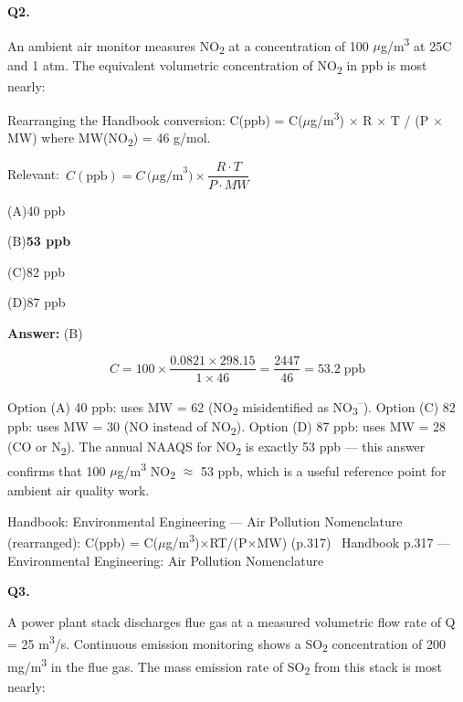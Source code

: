 \documentclass[11pt]{article}
\newcommand{\correct}[1]{\textbf{#1}\;{\color{accent}$\checkmark$}}
\newcommand{\optline}[2]{\par\noindent\hspace{1.2em}(#1)\hspace{0.6em}#2}
\begin{document}
\vspace{9pt}
\filbreak
\textbf{\color{accent}Q2.}\par\vspace{2pt}
An ambient air monitor measures NO\textsubscript{2} at a concentration of 100 $\mu$g/m\textsuperscript{3} at 25\textdegree{}C and 1 atm. The equivalent volumetric concentration of NO\textsubscript{2} in ppb is most nearly:

Rearranging the Handbook conversion:
C(ppb) = C($\mu$g/m\textsuperscript{3}) $\times$ R $\times$ T / (P $\times$ MW)
where MW(NO\textsubscript{2}) = 46 g/mol.\par\vspace{3pt}
{\small\color{soft}Relevant:}\ $C(\text{ppb}) = C\,\bigl(\mu\text{g/m}^3\bigr) \times \dfrac{R \cdot T}{P \cdot MW}$\par\vspace{3pt}
\optline{A}{40 ppb}
\optline{B}{\correct{53 ppb}}
\optline{C}{82 ppb}
\optline{D}{87 ppb}
\par\vspace{3pt}
\vspace{2pt}\par\noindent\colorbox{boxbg}{\parbox{\dimexpr\linewidth-2\fboxsep\relax}{%
\vspace{2pt}\textbf{Answer:} (B)\par\vspace{2pt}
{\small \[C = 100 \times \frac{0.0821\times 298.15}{1\times 46} = \frac{2447}{46} = 53.2\;\text{ppb}\]

Option (A) 40 ppb: uses MW = 62 (NO\textsubscript{2} misidentified as NO\textsubscript{3}\textsuperscript{--}). Option (C) 82 ppb: uses MW = 30 (NO instead of NO\textsubscript{2}). Option (D) 87 ppb: uses MW = 28 (CO or N\textsubscript{2}). The annual NAAQS for NO\textsubscript{2} is exactly 53 ppb --- this answer confirms that 100 $\mu$g/m\textsuperscript{3} NO\textsubscript{2} $\approx$ 53 ppb, which is a useful reference point for ambient air quality work.}\par\vspace{2pt}
{\footnotesize\color{soft}Handbook: Environmental Engineering --- Air Pollution Nomenclature (rearranged): C(ppb) = C($\mu$g/m\textsuperscript{3})$\times$RT/(P$\times$MW) (p.317) \textbullet\ Handbook p.317 --- Environmental Engineering: Air Pollution Nomenclature}\vspace{2pt}
}}
\vspace{9pt}
\filbreak
\textbf{\color{accent}Q3.}\par\vspace{2pt}
A power plant stack discharges flue gas at a measured volumetric flow rate of Q = 25 m\textsuperscript{3}/s. Continuous emission monitoring shows a SO\textsubscript{2} concentration of 200 mg/m\textsuperscript{3} in the flue gas. The mass emission rate of SO\textsubscript{2} from this stack is most nearly:
\end{document}

